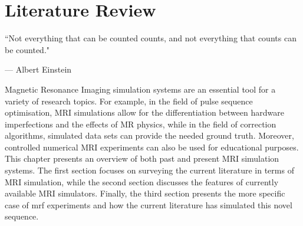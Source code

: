 \chapter{Literature Review}
\label{chapterlabel2}
\epigraph{``Not everything that can be counted counts, and not everything that counts can
be counted."}{--- \textup{Albert Einstein}}

Magnetic Resonance Imaging simulation systems are an essential tool for a variety of research topics.
For example, in the field of pulse sequence optimisation, MRI simulations allow for the differentiation between hardware imperfections and the effects of MR physics, 
while in the field of correction algorithms, simulated data sets can provide the needed ground truth.
Moreover, controlled numerical MRI experiments can also be used for educational purposes.
This chapter presents an overview of both past and present MRI simulation systems.
The first section focuses on surveying the current literature in terms of MRI simulation, while the second section discusses the features of currently available MRI simulators.
Finally, the third section presents the more specific case of \ac{mrf} experiments and how the current literature has simulated this novel sequence.

\hfill




\clearpage


\clearpage

%


